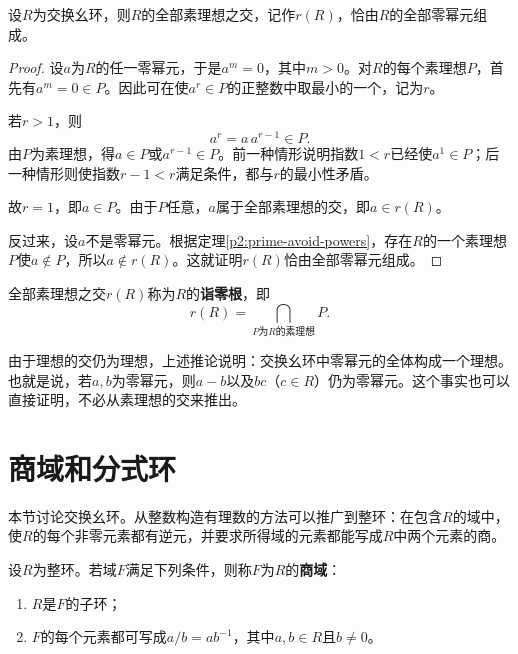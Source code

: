 \begin{corollary}
设$R$为交换幺环，则$R$的全部素理想之交，记作$r(R)$，恰由$R$的全部零幂元组成。
\end{corollary}
\begin{proof}
设$a$为$R$的任一零幂元，于是$a^m=0$，其中$m>0$。对$R$的每个素理想$P$，首先有$a^m=0\in P$。因此可在使$a^r\in P$的正整数中取最小的一个，记为$r$。

若$r>1$，则
\[
a^r=a\,a^{r-1}\in P.
\]
由$P$为素理想，得$a\in P$或$a^{r-1}\in P$。前一种情形说明指数$1<r$已经使$a^1\in P$；后一种情形则使指数$r-1<r$满足条件，都与$r$的最小性矛盾。

故$r=1$，即$a\in P$。由于$P$任意，$a$属于全部素理想的交，即$a\in r(R)$。

反过来，设$a$不是零幂元。根据定理\ref{p2:prime-avoid-powers}，存在$R$的一个素理想$P$使$a\notin P$，所以$a\notin r(R)$。这就证明$r(R)$恰由全部零幂元组成。
\end{proof}

\begin{definition}
全部素理想之交$r(R)$称为$R$的\textbf{诣零根}，即
\[
r(R)=\bigcap_{P\text{为}R\text{的素理想}}P.
\]
\end{definition}

由于理想的交仍为理想，上述推论说明：交换幺环中零幂元的全体构成一个理想。也就是说，若$a,b$为零幂元，则$a-b$以及$bc$（$c\in R$）仍为零幂元。这个事实也可以直接证明，不必从素理想的交来推出。




\section{商域和分式环}

本节讨论交换幺环。从整数构造有理数的方法可以推广到整环：在包含$R$的域中，使$R$的每个非零元素都有逆元，并要求所得域的元素都能写成$R$中两个元素的商。

\begin{definition}
设$R$为整环。若域$F$满足下列条件，则称$F$为$R$的\textbf{商域}：
\begin{enumerate}
\item $R$是$F$的子环；
\item $F$的每个元素都可写成$a/b=ab^{-1}$，其中$a,b\in R$且$b\ne0$。
\end{enumerate}
\end{definition}

